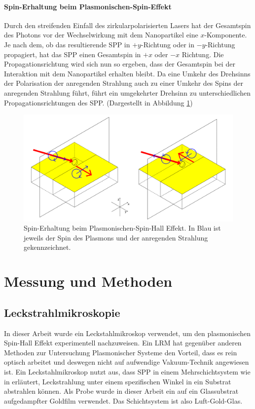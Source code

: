 \documentclass[titlepage]{article}
\begin{document}
	\paragraph{Spin-Erhaltung beim Plasmonischen-Spin-Effekt}
		Durch den streifenden Einfall des zirkularpolarisierten Lasers hat der Gesamtspin des Photons vor der Wechselwirkung mit dem Nanopartikel eine $x$-Komponente. Je nach dem, ob das resultierende SPP in $+y$-Richtung oder in $-y$-Richtung propagiert, hat das SPP einen Gesamtspin in  $+x$ oder $-x$ Richtung. Die Propagationsrichtung wird sich nun so ergeben, dass der Gesamtspin bei der Interaktion mit dem Nanopartikel erhalten bleibt. Da eine Umkehr des Drehsinns der Polarisation der anregenden Strahlung auch zu einer Umkehr des Spins der anregenden Strahlung führt, führt ein umgekehrter Drehsinn zu unterschiedlichen Propagationsrichtungen des SPP. (Dargestellt in Abbildung \ref{fig:spin_hall_schema})
		\begin{figure}[h]
			\centering
			\includegraphics[width=1.0\linewidth]{figures/spin_hall_schema.pdf}
			\caption{Spin-Erhaltung beim Plasmonischen-Spin-Hall Effekt. In Blau ist jeweils der Spin des Plasmons und der anregenden Strahlung gekennzeichnet.}
			\label{fig:spin_hall_schema}
		\end{figure}


 	
\section{Messung und Methoden}
\subsection{Leckstrahlmikroskopie}
	In dieser Arbeit wurde ein Leckstahlmikroskop verwendet, um den plasmonischen Spin-Hall Effekt experimentell nachzuweisen. Ein LRM hat gegenüber anderen Methoden zur Untersuchung Plasmonischer Systeme den Vorteil, dass es rein optisch arbeitet und deswegen nicht auf aufwendige Vakuum-Technik angewiesen ist. Ein Leckstahlmikroskop nutzt aus, dass SPP in einem Mehrschichtsystem wie in  erläutert, Leckstrahlung unter einem spezifischen Winkel in ein Substrat abstrahlen können. Als Probe wurde in dieser Arbeit ein auf ein Glassubstrat aufgedampfter Goldfilm verwendet. Das Schichtsystem ist also Luft-Gold-Glas.
	
\end{document}
